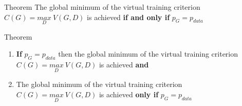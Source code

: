 \begin{frame}
	\begin{block}{Theorem}
		The global minimum of the virtual training criterion $C(G)=\underset{D}{max} ~V(G,D)$ is achieved \textbf{if and only if} $p_G=p_{data}$\\
	\end{block}

	\begin{center}
	\end{center}

	{
		\begin{block}{Theorem}
			\begin{enumerate}
				\item \textbf{If} $p_G=p_{data}$ then the global minimum of the virtual training criterion $C(G)=\underset{D}{max} ~V(G,D)$ is achieved  \textbf{and}
				\item<4-> The global minimum of the virtual training criterion $C(G)=\underset{D}{max} ~V(G,D)$ is achieved \textbf{only if} $p_G=p_{data}$
			\end{enumerate}
		\end{block}
	}
\end{frame}

